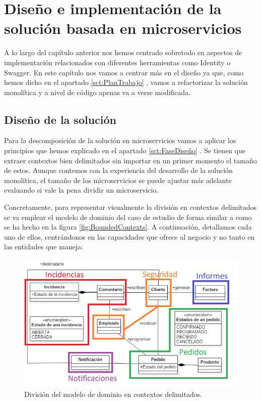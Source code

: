 \documentclass[11pt,spanish,listoffigures]{tfgetsinf}
\begin{document}
%

\chapter{Diseño e implementación de la solución basada en microservicios}

A lo largo del capítulo anterior nos hemos centrado sobretodo en aspectos de implementación relacionados con diferentes herramientas como Identity o Swagger. En este capítulo nos vamos a centrar más en el diseño ya que, como hemos dicho en el apartado \ref{sct:PlanTrabajo} , vamos a refactorizar la solución monolítica y a nivel de código apenas va a verse modificada.

\section{Diseño de la solución}

Para la descomposición de la solución en microservicios vamos a aplicar los principios que hemos explicado en el apartado \ref{sct:FaseDiseño} . Se tienen que extraer contextos bien delimitados sin importar en un primer momento el tamaño de estos. Aunque contemos con la experiencia del desarrollo de la solución monolítica, el tamaño de los microservicios se puede ajustar más adelante evaluando si vale la pena dividir un microservicio.

Concretamente, para representar visualmente la división en contextos delimitados se va emplear el modelo de dominio del caso de estudio de forma similar a como se ha hecho en la figura \ref{fig:BoundedContexts}. A continuación, detallamos cada uno de ellos, centrándonos en las capacidades que ofrece al negocio y no tanto en las entidades que maneja:

\begin{figure}[h]
\centering
\includegraphics[scale=1]{ShopBoundedContexts}
\caption{División del modelo de dominio en contextos delimitados.}
\end{figure}
\end{document}
